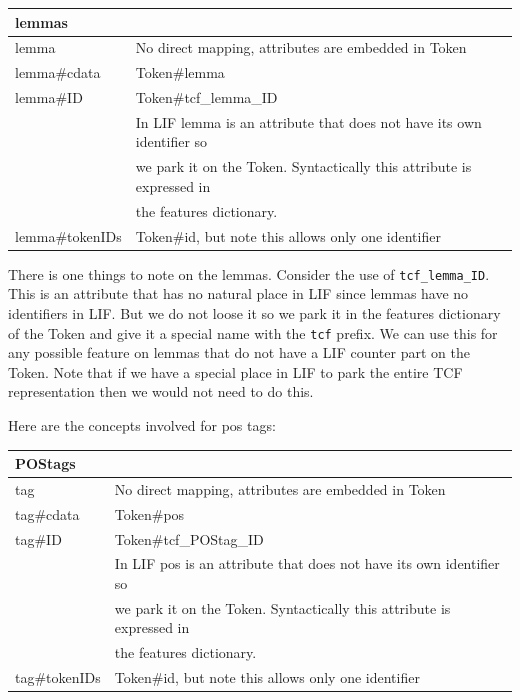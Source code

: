 \documentclass[11pt]{article}
\newcommand{\attr}[1]{{\tt #1}}
\newenvironment{mappings}
	{\medskip\begin{tabular}{|l|l|}\hline}
	{\hline\end{tabular}\medskip}
\newenvironment{vocabitem}
	{\begin{mappings}}
	{\end{mappings}}
\begin{document}

\begin{mappings}
lemmas			 	& \\ \hline
lemma 				& No direct mapping, attributes are embedded in Token \\ \hline
lemma\#cdata		& Token\#lemma \\ \hline
lemma\#ID 			& Token\#tcf\_lemma\_ID \\
					& In LIF lemma is an attribute that does not have its own identifier so \\
					& we park it on the Token. Syntactically this attribute is expressed in \\
					& the features dictionary. \\ \hline
lemma\#tokenIDs 	& Token\#id, but note this allows only one identifier \\
\end{mappings}

There is one things to note on the lemmas. Consider the use of \attr{tcf\_lemma\_ID}. This is an attribute that has no natural place in LIF since lemmas have no identifiers in LIF. But we do not loose it so we park it in the features dictionary of the Token and give it a special name with the \attr{tcf} prefix. We can use this for any possible feature on lemmas that do not have a LIF counter part on the Token. Note that if we have a special place in LIF to park the entire TCF representation then we would not need to do this.

Here are the concepts involved for pos tags:

\begin{mappings}
POStags			& \\ \hline
tag 			& No direct mapping, attributes are embedded in Token \\ \hline
tag\#cdata		& Token\#pos \\ \hline
tag\#ID 		& Token\#tcf\_POStag\_ID \\
				& In LIF pos is an attribute that does not have its own identifier so \\
				& we park it on the Token. Syntactically this attribute is expressed in \\
				& the features dictionary. \\ \hline
tag\#tokenIDs	& Token\#id, but note this allows only one identifier \\
\end{mappings}
\end{document}
